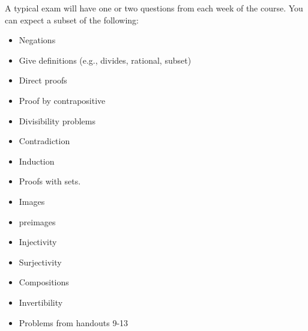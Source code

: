A typical exam will have one or two questions from each week of the course. You can expect a subset of the following:
\begin{itemize}
\item Negations
\item Give definitions (e.g., divides, rational, subset)
\item Direct proofs
\item Proof by contrapositive
\item Divisibility problems
\item Contradiction
\item Induction
\item Proofs with sets. 
\item Images
\item preimages
\item Injectivity 
\item Surjectivity
\item Compositions
\item Invertibility
\item Problems from handouts 9-13  
\end{itemize}




